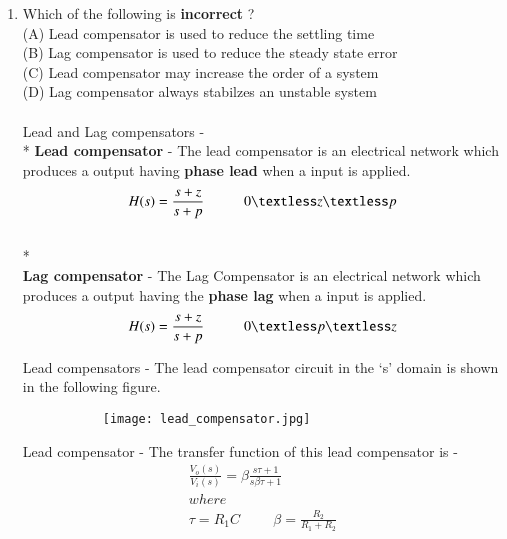 \begin{enumerate}[label=\thesubsection.\arabic*.,ref=\thesubsection.\theenumi]
\item Which of the following is \textbf{incorrect} ?\\
(A) Lead compensator is used to reduce the settling time\\
(B) Lag compensator is used to reduce the steady state error\\
(C) Lead compensator may increase the order of a system\\
(D) Lag compensator always stabilzes an unstable system\\
\\
\solution Lead and Lag compensators - 
\\* \textbf{Lead compensator } - The lead compensator is an electrical network which produces a output having \textbf{phase lead} when a input is applied. 
\\
\begin{equation}
H(s) = \frac{s+z}{s+p}  \hspace{1cm} 0 \textless z \textless p
\centering
\end{equation}
\\* \textbf{\\Lag compensator} - The Lag Compensator is an electrical network which produces a  output having the \textbf{phase lag} when a input is applied.
\begin{equation}
H(s) = \frac{s+z}{s+p}  \hspace{1cm} 0 \textless p \textless z
\centering
\end{equation}


Lead compensators - 
The lead compensator circuit in the ‘s’ domain is shown in the following figure.
 
\begin{figure}[h]
 
\begin{subfigure}{0.5\textwidth}
\texttt{[image: lead\_compensator.jpg]} 
\label{fig:subim1}
\end{subfigure}
\end{figure}


Lead compensator - 
The transfer function of this lead compensator is -
\begin{align}
    \frac{V_o(s)}{V_i(s)} = \beta  \frac{s \tau +1}{s\beta \tau +1} \\
where\\
\tau = R_1C \hspace{1cm} \beta =\frac{R_2}{R_1+R_2}
\end{align}


\end{enumerate}
